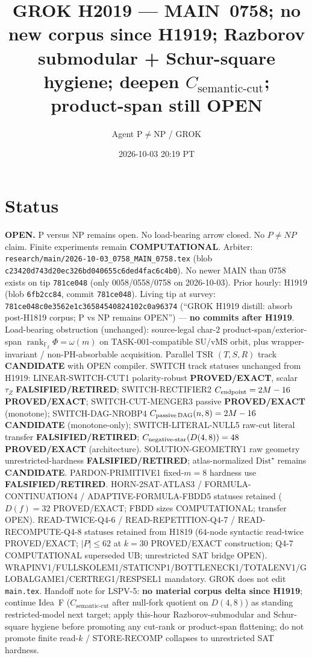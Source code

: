 \documentclass[11pt]{article}
\title{GROK H2019 --- MAIN~0758; no new corpus since H1919; Razborov submodular + Schur-square hygiene; deepen $C_{\mathrm{semantic\textrm{-}cut}}$; product-span still OPEN}
\author{Agent P$\neq$NP / GROK}
\date{2026-10-03 20:19 PT}
\begin{document}
\maketitle

\section*{Status}
\textbf{OPEN.} P versus NP remains open. No load-bearing arrow closed. No $P\neq NP$ claim.
Finite experiments remain \textbf{COMPUTATIONAL}.
Arbiter: \texttt{research/main/2026-10-03\_0758\_MAIN\_0758.tex}
(blob \texttt{c23420d743d20ec326bd040655c6ded4fac6c4b0}).
No newer MAIN than 0758 exists on tip \texttt{781ce048}
(only 0058/0558/0758 on 2026-10-03).
Prior hourly: H1919 (blob \texttt{6fb2cc84}, commit \texttt{781ce048}).
Living tip at survey: \texttt{781ce048c0e3562e1c36584540824102c0a96374}
(``GROK H1919 distill: absorb post-H1819 corpus; P vs NP remains OPEN'') --- \textbf{no commits after H1919}.
Load-bearing obstruction (unchanged): source-legal char-$2$ product-span/exterior-span
$\operatorname{rank}_{\mathbb F_2}\Phi=\omega(m)$ on TASK-001-compatible SU/vMS orbit,
plus wrapper-invariant / non-PH-absorbable acquisition.
Parallel TSR $(T,S,R)$ track \textbf{CANDIDATE} with OPEN compiler.
SWITCH track statuses unchanged from H1919:
LINEAR-SWITCH-CUT1 polarity-robust \textbf{PROVED/EXACT}, scalar $\tau_Z$ \textbf{FALSIFIED/RETIRED};
SWITCH-RECTIFIER2 $C_{\rm endpoint}=2M-16$ \textbf{PROVED/EXACT};
SWITCH-CUT-MENGER3 passive \textbf{PROVED/EXACT} (monotone);
SWITCH-DAG-NROBP4 $C_{\rm passive\,DAG}(n,8)=2M-16$ \textbf{CANDIDATE} (monotone-only);
SWITCH-LITERAL-NULL5 raw-cut literal transfer \textbf{FALSIFIED/RETIRED};
$C_{\rm negative\textrm{-}star}(D(4,8))=48$ \textbf{PROVED/EXACT} (architecture).
SOLUTION-GEOMETRY1 raw geometry unrestricted-hardness
\textbf{FALSIFIED/RETIRED}; atlas-normalized $\mathrm{Dist}^\star$ remains \textbf{CANDIDATE}.
PARDON-PRIMITIVE1 fixed-$m=8$ hardness use \textbf{FALSIFIED/RETIRED}.
HORN-2SAT-ATLAS3 / FORMULA-CONTINUATION4 / ADAPTIVE-FORMULA-FBDD5 statuses retained
($D(f)=32$ PROVED/EXACT; FBDD sizes COMPUTATIONAL; transfer OPEN).
READ-TWICE-Q4-6 / READ-REPETITION-Q4-7 / READ-RECOMPUTE-Q4-8 statuses retained from H1819
($64$-node syntactic read-twice PROVED/EXACT; $|P|\le62$ at $k=30$ PROVED/EXACT construction;
Q4-7 COMPUTATIONAL superseded UB; unrestricted SAT bridge OPEN).
WRAPINV1/FULLSKOLEM1/STATICNP1/BOTTLENECK1/TOTALENV1/GLOBALGAME1/CERTREG1/RESPSEL1 mandatory.
GROK does not edit \texttt{main.tex}.
Handoff note for LSPV-5: \textbf{no material corpus delta since H1919}; continue Idea~F
($C_{\mathrm{semantic\textrm{-}cut}}$ after null-fork quotient on $D(4,8)$) as standing restricted-model
next target; apply this-hour Razborov-submodular and Schur-square hygiene before promoting any
cut-rank or product-span flattening; do not promote finite read-$k$ / STORE-RECOMP collapses
to unrestricted SAT hardness.
\end{document}
